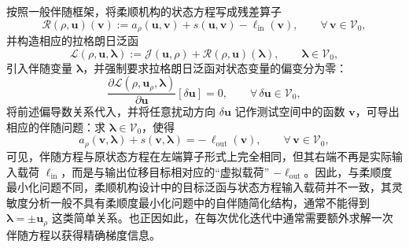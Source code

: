 按照一般伴随框架，将柔顺机构的状态方程写成残差算子
\[
\mathcal{R}(\rho,\boldsymbol{u})(\boldsymbol{v}) := a_\rho(\boldsymbol{u},\boldsymbol{v}) + s(\boldsymbol{u},\boldsymbol{v}) - \ell_{\mathrm{in}}(\boldsymbol{v}), \qquad \forall\,\boldsymbol{v}\in\mathcal{V}_0,
\]
并构造相应的拉格朗日泛函
\[
\mathcal{L}(\rho,\boldsymbol{u},\boldsymbol{\lambda}) := \mathcal{J}(\boldsymbol{u},\rho)  + \mathcal{R}(\rho,\boldsymbol{u})(\boldsymbol{\lambda}),\qquad\boldsymbol{\lambda}\in\mathcal{V}_0,
\]
引入伴随变量 $\boldsymbol{\lambda}$，并强制要求拉格朗日泛函对状态变量的偏变分为零：
\[
\frac{\partial\mathcal{L}(\rho,\boldsymbol{u}_\rho,\boldsymbol{\lambda})} {\partial\boldsymbol{u}}[\delta\boldsymbol{u}] = 0, \qquad \forall\,\delta\boldsymbol{u}\in\mathcal{V}_0,
\]
将前述偏导数关系代入，并将任意扰动方向 $\delta\boldsymbol{u}$ 记作测试空间中的函数 $\boldsymbol{v}$，可导出相应的伴随问题：求 $\boldsymbol{\lambda}\in\mathcal{V}_0$，使得
\[
a_\rho(\boldsymbol{v},\boldsymbol{\lambda}) + s(\boldsymbol{v},\boldsymbol{\lambda}) = -\,\ell_{\mathrm{out}}(\boldsymbol{v}), \qquad \forall\,\boldsymbol{v}\in\mathcal{V}_0,
\]
可见，伴随方程与原状态方程在左端算子形式上完全相同，但其右端不再是实际输入载荷 $\ell_{\mathrm{in}}$，而是与输出位移目标相对应的“虚拟载荷” $-\ell_{\mathrm{out}}$。因此，与柔顺度最小化问题不同，柔顺机构设计中的目标泛函与状态方程输入载荷并不一致，其灵敏度分析一般不具有柔顺度最小化问题中的自伴随简化结构，通常不能得到 $\boldsymbol{\lambda}=\pm\boldsymbol{u}_\rho$ 这类简单关系。也正因如此，在每次优化迭代中通常需要额外求解一次伴随方程以获得精确梯度信息。

